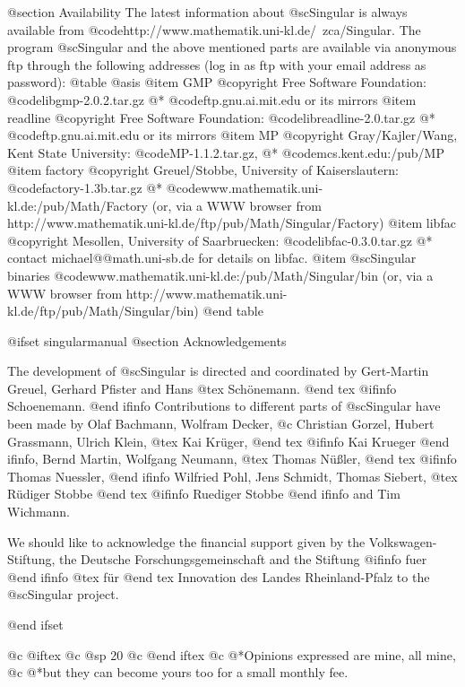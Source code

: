 @section Availability
The latest information about @sc{Singular} is always available from
@code{http://www.mathematik.uni-kl.de/~zca/Singular}.
The program @sc{Singular} and the above mentioned parts are available via
anonymous ftp through the following addresses
(log in as ftp with your email address as password):
@table @asis
@item GMP
@copyright{} Free Software Foundation:
@code{libgmp-2.0.2.tar.gz}
@* @code{ftp.gnu.ai.mit.edu} or its mirrors
@item readline
@copyright{} Free Software Foundation:
@code{libreadline-2.0.tar.gz}
@* @code{ftp.gnu.ai.mit.edu} or its mirrors
@item MP
@copyright{} Gray/Kajler/Wang, Kent State University:
@code{MP-1.1.2.tar.gz},
@* @code{mcs.kent.edu:/pub/MP}
@item factory
@copyright{} Greuel/Stobbe, University of Kaiserslautern:
@code{factory-1.3b.tar.gz}
@* @code{www.mathematik.uni-kl.de:/pub/Math/Factory}
(or, via a WWW browser from http://www.mathematik.uni-kl.de/ftp/pub/Math/Singular/Factory)
@item libfac
@copyright{}  Mesollen, University  of Saarbruecken:
@code{libfac-0.3.0.tar.gz}
@* contact michael@@math.uni-sb.de for details on libfac.
@item @sc{Singular} binaries
@code{www.mathematik.uni-kl.de:/pub/Math/Singular/bin}
(or, via a WWW browser from http://www.mathematik.uni-kl.de/ftp/pub/Math/Singular/bin)
@end table

@ifset singularmanual
@section Acknowledgements

The development of @sc{Singular} is directed and coordinated by
Gert-Martin Greuel, Gerhard Pfister and Hans
@tex
 Sch\"onemann.
@end tex
@ifinfo
 Schoenemann.
@end ifinfo
Contributions to different parts of @sc{Singular} have been made by
Olaf Bachmann,
Wolfram Decker,
@c Christian Gorzel,
Hubert Grassmann,
Ulrich Klein,
@tex
Kai Kr\"uger,
@end tex
@ifinfo
Kai Krueger
@end ifinfo,
Bernd Martin,
Wolfgang Neumann,
@tex
Thomas N\"u{\ss}ler,
@end tex
@ifinfo
Thomas Nuessler,
@end ifinfo
Wilfried Pohl,
Jens Schmidt,
Thomas Siebert,
@tex
R\"udiger Stobbe
@end tex
@ifinfo
Ruediger Stobbe
@end ifinfo
and
Tim Wichmann.

We should like to acknowledge the financial support given by
the Volkswagen-Stiftung,
the Deutsche Forschungsgemeinschaft
and the Stiftung
@ifinfo
fuer
@end ifinfo
@tex
f\"ur
@end tex
 Innovation des Landes Rheinland-Pfalz
to the
@sc{Singular} project.

@end ifset

@c @iftex
@c @sp 20
@c @end iftex
@c @*Opinions expressed are mine,  all mine,
@c @*but they can become yours too for a small monthly fee.
